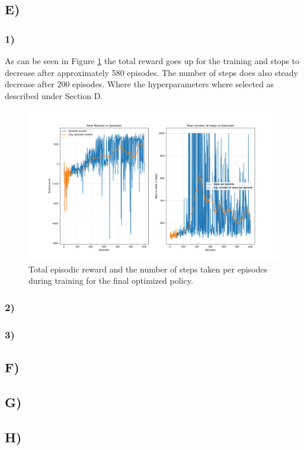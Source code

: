 \documentclass{article}
\begin{document}
\subsection*{E)}
\subsubsection*{1)}
As can be seen in Figure \ref{fig:Policy} the total reward goes up for the training and stops to decrease after approximately 580 episodes. The number of steps does also steady decrease after 200 episodes. Where the hyperparameters where selected as described under Section D.
\begin{figure}[H]
    \centering
    \includegraphics[width=1\textwidth]{Lab_2/problem1/images/First_run.png}
    \caption{\small Total episodic reward and the number of steps taken per episodes during training for the final optimized policy. }
    \label{fig:Policy}
\end{figure}

\subsubsection*{2)}


\subsubsection*{3)}


\subsection*{F)}

\subsection*{G)}

\subsection*{H)}
\end{document}

